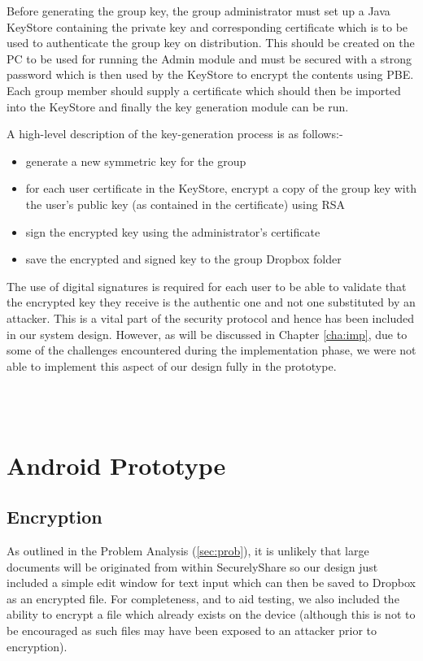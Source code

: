 Before generating the group key, the group administrator must set up a Java KeyStore containing the private key and corresponding certificate which is to be used to authenticate the group key on distribution.  This should be created on the PC to be used for running the Admin module and must be secured with a strong password which is then used by the KeyStore to encrypt the contents using PBE.  Each group member should supply a certificate which should then be imported into the KeyStore and finally the key generation module can be run.  

A high-level description of the key-generation process is as follows:-
\begin{itemize}
\item generate a new  symmetric key for the group
\item for each user certificate in the KeyStore, encrypt a copy of the group key with the user's public key (as contained in the certificate) using RSA
\item sign the encrypted key using the administrator's certificate
\item save the encrypted and signed key to the group Dropbox folder 
\end{itemize}

The use of digital signatures is required for each user to be able to validate that the encrypted key they receive is the authentic one and not one substituted by an attacker.  This  is a vital part of the  security protocol and hence has been included in our  system design.  However, as will be discussed in Chapter \ref{cha:imp}, due to some of the challenges encountered during the implementation phase, we were not able to implement this aspect of our design fully in the prototype.

\\

\\

\section{Android Prototype }

\subsection*{Encryption }
As outlined in the Problem Analysis  (\ref{sec:prob}), it is unlikely that large documents will be originated from within SecurelyShare so our design just included a simple  edit window for text input which can then be saved to Dropbox as an encrypted file.  For completeness, and to aid testing, we also included the ability to encrypt a file which already exists on the device (although this is not to be encouraged as such files may have been exposed to an attacker prior to encryption).



